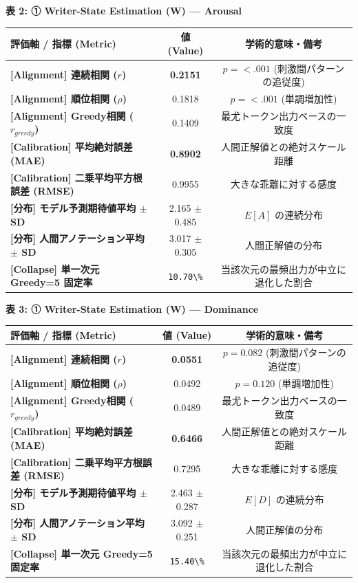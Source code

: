 \textbf{表 2: ① Writer-State Estimation (W) — Arousal}
\begin{center}
\small
\begin{tabular}{lcc}
\toprule
\textbf{評価軸 / 指標 (Metric)} & \textbf{値 (Value)} & \textbf{学術的意味・備考} \\
\midrule
\textbf{[Alignment] 連続相関 ($r$)} & \textbf{0.2151} & $p = <.001 $ (刺激間パターンの追従度) \\
\textbf{[Alignment] 順位相関 ($\rho$)} & 0.1818 & $p = <.001 $ (単調増加性) \\
\textbf{[Alignment] Greedy相関 ($r_{greedy}$)} & 0.1409 & 最尤トークン出力ベースの一致度 \\
\textbf{[Calibration] 平均絶対誤差 (MAE)} & \textbf{0.8902} & 人間正解値との絶対スケール距離 \\
\textbf{[Calibration] 二乗平均平方根誤差 (RMSE)} & 0.9955 & 大きな乖離に対する感度 \\
\textbf{[分布] モデル予測期待値平均 $\pm$ SD} & 2.165 $\pm$ 0.485 & $E[A]$ の連続分布 \\
\textbf{[分布] 人間アノテーション平均 $\pm$ SD} & 3.017 $\pm$ 0.305 & 人間正解値の分布 \\
\textbf{[Collapse] 単一次元 Greedy=5 固定率} & \texttt{10.70\textbackslash{}\%} & 当該次元の最頻出力が中立に退化した割合 \\
\bottomrule
\end{tabular}
\end{center}


\textbf{表 3: ① Writer-State Estimation (W) — Dominance}
\begin{center}
\small
\begin{tabular}{lcc}
\toprule
\textbf{評価軸 / 指標 (Metric)} & \textbf{値 (Value)} & \textbf{学術的意味・備考} \\
\midrule
\textbf{[Alignment] 連続相関 ($r$)} & \textbf{0.0551} & $p = 0.082 $ (刺激間パターンの追従度) \\
\textbf{[Alignment] 順位相関 ($\rho$)} & 0.0492 & $p = 0.120 $ (単調増加性) \\
\textbf{[Alignment] Greedy相関 ($r_{greedy}$)} & 0.0489 & 最尤トークン出力ベースの一致度 \\
\textbf{[Calibration] 平均絶対誤差 (MAE)} & \textbf{0.6466} & 人間正解値との絶対スケール距離 \\
\textbf{[Calibration] 二乗平均平方根誤差 (RMSE)} & 0.7295 & 大きな乖離に対する感度 \\
\textbf{[分布] モデル予測期待値平均 $\pm$ SD} & 2.463 $\pm$ 0.287 & $E[D]$ の連続分布 \\
\textbf{[分布] 人間アノテーション平均 $\pm$ SD} & 3.092 $\pm$ 0.251 & 人間正解値の分布 \\
\textbf{[Collapse] 単一次元 Greedy=5 固定率} & \texttt{15.40\textbackslash{}\%} & 当該次元の最頻出力が中立に退化した割合 \\
\bottomrule
\end{tabular}
\end{center}


